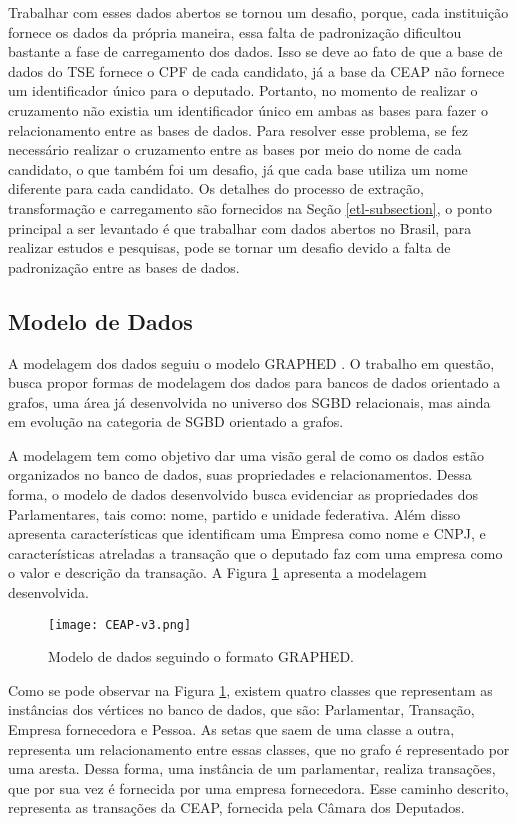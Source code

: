 Trabalhar com esses dados abertos se tornou um desafio, porque, cada instituição fornece os dados da própria maneira, essa falta de padronização dificultou bastante a fase de carregamento dos dados. Isso se deve ao fato de que a base de dados do TSE fornece o CPF de cada candidato, já a base da CEAP não fornece um identificador único para o deputado. Portanto, no momento de realizar o cruzamento não existia um identificador único em ambas as bases para fazer o relacionamento entre as bases de dados. Para resolver esse problema, se fez necessário realizar o cruzamento entre as bases por meio do nome de cada candidato, o que também foi um desafio, já que cada base utiliza um nome diferente para cada candidato. Os detalhes do processo de extração, transformação e carregamento são fornecidos na Seção \ref{etl-subsection}, o ponto principal a ser levantado é que trabalhar com dados abertos no Brasil, para realizar estudos e pesquisas, pode se tornar um desafio devido a falta de padronização entre as bases de dados. 

\subsection{Modelo de Dados}

A modelagem dos dados seguiu o modelo GRAPHED \cite{graphed}. O trabalho em questão, busca propor formas de modelagem dos dados para bancos de dados orientado a grafos, uma área já desenvolvida no universo dos SGBD relacionais, mas ainda em evolução na categoria de SGBD orientado a grafos.

A modelagem tem como objetivo dar uma visão geral de como os dados estão organizados no banco de dados, suas propriedades e relacionamentos. Dessa forma, o modelo de dados desenvolvido busca evidenciar as propriedades dos Parlamentares, tais como: nome, partido e unidade federativa. Além disso apresenta características que identificam uma Empresa como nome e CNPJ, e características atreladas a transação que o deputado faz com uma empresa como o valor e descrição da transação. A Figura \ref{fig:modeloDeDados} apresenta a modelagem  desenvolvida.

\begin{figure}[H]
\centering
\texttt{[image: CEAP-v3.png]}
\caption{Modelo de dados seguindo o formato GRAPHED.}
\label{fig:modeloDeDados}
\end{figure}

Como se pode observar na Figura \ref{fig:modeloDeDados}, existem quatro classes que representam as instâncias dos vértices no banco de dados, que são: Parlamentar, Transação, Empresa fornecedora e Pessoa. As setas que saem de uma classe a outra, representa um relacionamento entre essas classes, que no grafo é representado por uma aresta. Dessa forma, uma instância de um parlamentar, realiza transações, que por sua vez é fornecida por uma empresa fornecedora. Esse caminho descrito, representa as transações da CEAP, fornecida pela Câmara dos Deputados.

